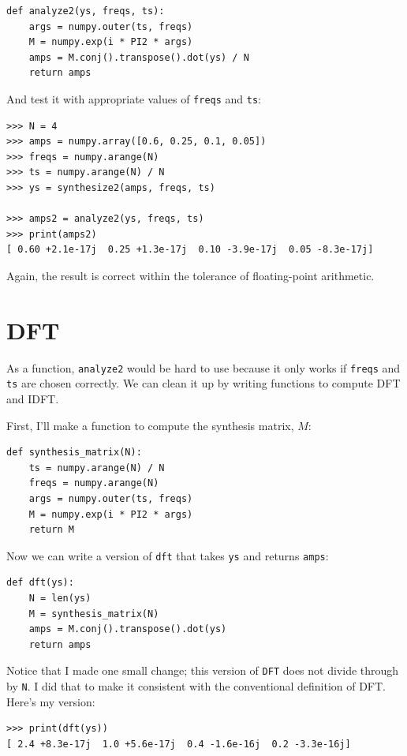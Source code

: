 \documentclass[12pt]{book}
\begin{document}
\begin{verbatim}
def analyze2(ys, freqs, ts):
    args = numpy.outer(ts, freqs)
    M = numpy.exp(i * PI2 * args)
    amps = M.conj().transpose().dot(ys) / N
    return amps
\end{verbatim}

And test it with appropriate values of {\tt freqs} and {\tt ts}:

\begin{verbatim}
>>> N = 4
>>> amps = numpy.array([0.6, 0.25, 0.1, 0.05])
>>> freqs = numpy.arange(N)
>>> ts = numpy.arange(N) / N
>>> ys = synthesize2(amps, freqs, ts)

>>> amps2 = analyze2(ys, freqs, ts)
>>> print(amps2)
[ 0.60 +2.1e-17j  0.25 +1.3e-17j  0.10 -3.9e-17j  0.05 -8.3e-17j]
\end{verbatim}

Again, the result is correct within the tolerance of floating-point
arithmetic.


\section{DFT}

As a function, {\tt analyze2} would be hard to use because it
only works if {\tt freqs} and {\tt ts} are chosen correctly.
We can clean it up by writing functions to compute DFT and IDFT.

First, I'll make a function to compute the synthesis matrix,
$M$:

\begin{verbatim}
def synthesis_matrix(N):
    ts = numpy.arange(N) / N
    freqs = numpy.arange(N)
    args = numpy.outer(ts, freqs)
    M = numpy.exp(i * PI2 * args)
    return M
\end{verbatim}

Now we can write a version of {\tt dft} that takes
{\tt ys} and returns {\tt amps}:

\begin{verbatim}
def dft(ys):
    N = len(ys)
    M = synthesis_matrix(N)
    amps = M.conj().transpose().dot(ys)
    return amps
\end{verbatim}

Notice that I made one small change; this version of {\tt DFT}
does not divide through by {\tt N}.  I did that to make it
consistent with the conventional definition of DFT.  Here's my
version:

\begin{verbatim}
>>> print(dft(ys))
[ 2.4 +8.3e-17j  1.0 +5.6e-17j  0.4 -1.6e-16j  0.2 -3.3e-16j]
\end{verbatim}
\end{document}
